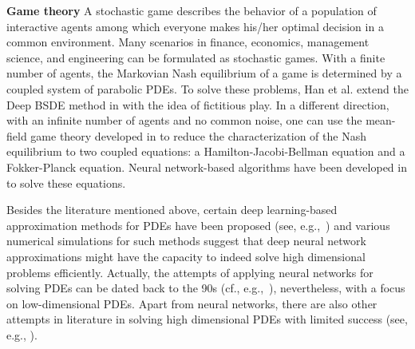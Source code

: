 \documentclass[12pt,AutoFakeBold,AutoFakeSlant]{article}
\theoremstyle{definition}
\begin{document}
	\vspace{.1in}
	\noindent
	{\bf Game theory}
	A stochastic game describes the behavior of a population of interactive agents among which everyone makes his/her optimal decision in a common environment. Many scenarios in finance, economics, management science, and engineering can be formulated as stochastic games. 
	With a finite number of agents, the Markovian Nash equilibrium of a game is determined by a coupled system of parabolic PDEs. 
	To solve these problems, Han et al. extend the Deep BSDE method in \cite{Han2019deep,han2020convergence} with the idea of fictitious play. 
	In a different direction, with an infinite number of agents and no common noise, one can use the mean-field game theory developed in \cite{LaLi1:2006,LaLi2:2006,LaLi:2007,HuMaCa:06,HuCaMa:07} to reduce the characterization of the Nash equilibrium to two coupled equations: a 
	Hamilton-Jacobi-Bellman equation and a Fokker-Planck equation. Neural network-based algorithms have been developed in \cite{Carmona2019convergence1,Carmona2019convergence2,Ruthotto2020machine,Lin2020apac} to solve these equations.

	\vspace{.1in}
	Besides the literature mentioned above, certain deep learning-based approximation methods for PDEs have been proposed (see, e.g.,~\cite{berg2018unified,dockhorn2019discussion,farahmand2017deep,fujii2019asymptotic,goudenege2019variance,jacquier2019deep,lye2020deep,magill2018neural,nusken2020solving,pham2019neural,raissi2018deep,cai2018approximating,zhang2019quantifying}) and various numerical simulations for such methods suggest that deep neural network approximations might have the capacity to indeed solve high dimensional problems efficiently. Actually, the attempts of applying neural networks for solving PDEs can be dated back to the 90s (cf., e.g.,~\cite{lee1990neural,uchiyama1993solving,lagaris1998artificial,jianyu2003numerical}), nevertheless, with a focus on low-dimensional PDEs.
	Apart from neural networks, there are also other attempts in literature in solving high dimensional PDEs with limited success (see, e.g., \cite{bally2003quantization,von2004numerical,zhang2004numerical,bouchard2004discrete,gobet2005regression,delarue2006forward,bender2007forward,gobet2008numerical,briand2014simulation,geiss2016simulation,gobet2010solving,fahim2011probabilistic,crisan2010probabilistic,crisan2010monte,crisan2012solving,crisan2014second,labart2013parallel,pham2015feynman,guo2015monotone,gobet2016stratified,gobet2016approximation,gobet2016linear,warin2018nesting,warin2018monte,ruszczynski2017dual,billaud2018stochastic}).
\end{document}
